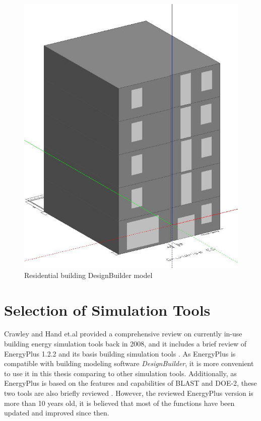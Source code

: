 \documentclass[a4paper, oneside]{discothesis}
\begin{document}
			\begin{figure}[H]
			\centering
			\includegraphics[scale=0.4]{HonggDesignBuilderModel.JPG}
			\caption{Residential building DesignBuilder model}
			\label{fig:HonggDB}
			\end{figure}


	\section{Selection of Simulation Tools}
		Crawley and Hand et.al provided a comprehensive review on currently in-use building energy simulation tools back in 2008, and it includes a brief review of EnergyPlus 1.2.2 and its basis building simulation tools \cite{crawley2008contrasting}. As EnergyPlus is compatible with building modeling software \textit{DesignBuilder}, it is more convenient to use it in this thesis comparing to other simulation tools. Additionally, as EnergyPlus is based on the features and capabilities of BLAST and DOE-2, these two tools are also briefly reviewed \cite{crawley2008contrasting}. However, the reviewed EnergyPlus version is more than 10 years old, it is believed that most of the functions have been updated and improved since then. \\
\end{document}
